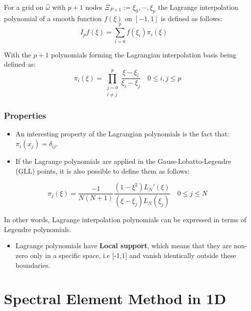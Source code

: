 \documentclass[
  a4paper,
  10pt]{article}
\providecommand{\tightlist}{%
  \setlength{\itemsep}{0pt}\setlength{\parskip}{0pt}}
\begin{document}
For a grid on \(\hat{\omega}\) with \(p+1\) nodes
\(\Xi_{P+1}:= {\xi_0,\cdots,\xi_p}\) the Lagrange interpolation
polynomial of a smooth function \(f(\xi)\) on \([-1,1]\) is defined as
follows: \begin{equation}
I_pf(\xi) = \sum_{i=0}^{p} f(\xi_{i})\pi_i(\xi)  \quad
\end{equation}

With the \(p+1\) polynomials forming the Lagrangian interpolation basis
being defined as: \begin{equation}
\pi_i(\xi)  = \prod_{\substack{j=0\\i \neq j}}^p \frac{\xi - \xi_i}{\xi_i - \xi_j}  \quad 0 \leq i,j \leq p
\end{equation}

\hypertarget{properties-1}{%
\subsubsection{Properties}\label{properties-1}}

\begin{itemize}
\item
  An interesting property of the Lagrangian polynomials is the fact
  that: \(\pi_i(x_j)=\delta_{ij}\).
\item
  If the Lagrange polynomials are applied in the Gauss-Lobatto-Legendre (GLL) points, it is also
  possible to define them as follows:
\end{itemize}

\begin{equation}
    \pi_j(\xi) = \frac{-1}{N(N+1)} \frac{(1-{\xi}^2)L_N'(\xi)}{(\xi-\xi_j)L_N(\xi_j)}  \quad 0 \leq j \leq N 
\end{equation}

In other words, Lagrange interpolation polynomials can be expressed in
terms of Legendre polynomials.

\begin{itemize}
\tightlist
\item
  Lagrange polynomials have \textbf{Local support}, which means that they
  are non-zero only in a specific space, i.e {[}-1,1{]} and vanish
  identically outside these boundaries.
\end{itemize}

\hypertarget{spectral-element-method-in-1d}{%
\section{Spectral Element Method in
1D}\label{spectral-element-method-in-1d}}
\end{document}
